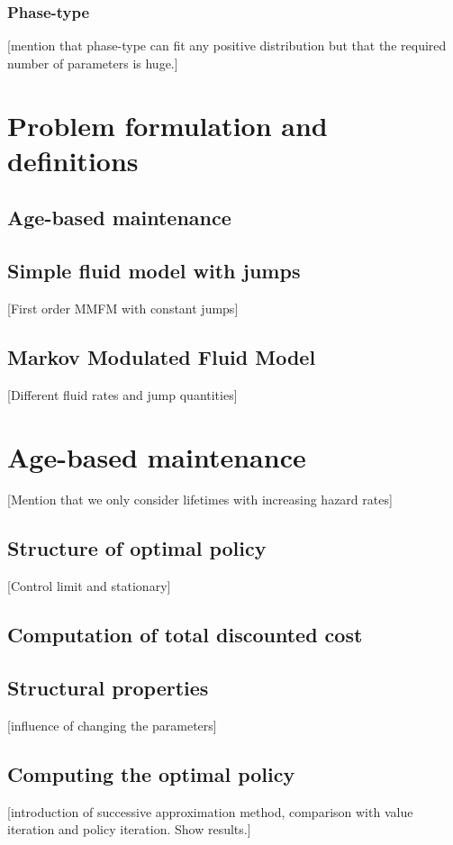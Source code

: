 \subsection{Phase-type}
[mention that phase-type can fit any positive distribution but that the required number of parameters is huge.]

\chapter{Problem formulation and definitions}
\section{Age-based maintenance}
\section{Simple fluid model with jumps}
[First order MMFM with constant jumps]
\section{Markov Modulated Fluid Model}
[Different fluid rates and jump quantities]

\chapter{Age-based maintenance}
[Mention that we only consider lifetimes with increasing hazard rates]
\section{Structure of optimal policy}
[Control limit and stationary]
\section{Computation of total discounted cost}
\section{Structural properties}
[influence of changing the parameters]
\section{Computing the optimal policy}
[introduction of successive approximation method, comparison with value iteration and policy iteration. Show results.]

